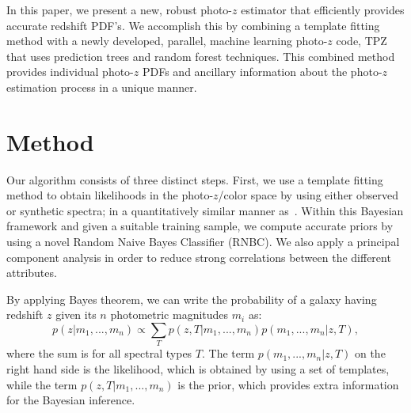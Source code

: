 In this paper, we present a new, robust photo-$z$ estimator that efficiently provides accurate redshift PDF's. We accomplish this by combining a template fitting method with a newly developed, parallel, machine learning photo-$z$ code, TPZ~\citep{Carrasco2013} that uses prediction trees and random forest techniques. This combined method provides individual photo-$z$ PDFs and ancillary information about the photo-$z$ estimation process in a unique manner.

\section{Method}

Our algorithm consists of three distinct steps. First, we use a template fitting method to obtain likelihoods in the photo-$z$/color space by using either observed or synthetic spectra; in a quantitatively similar manner as~\cite{Benitez2000}. Within this Bayesian framework and given a suitable training sample, we compute accurate priors by using a novel Random Naive Bayes Classifier (RNBC). We also apply a principal component analysis in order to reduce strong correlations between the different attributes. 

By applying Bayes theorem, we can write the probability of a galaxy having redshift $z$ given its $n$ photometric magnitudes $m_i$ as:
\begin{equation}\label{bayes}
p(z|m_1,...,m_n) \propto \sum_T p(z,T|m_1,...,m_n)p(m_1,...,m_n|z,T),
\end{equation}
where the sum is for all spectral types $T$. The term $p(m_1,...,m_n|z,T)$ on the right hand side is the likelihood, which is obtained by using a set of templates, while the term $p(z,T|m_1,...,m_n)$ is the prior, which provides extra information for the Bayesian inference. 

